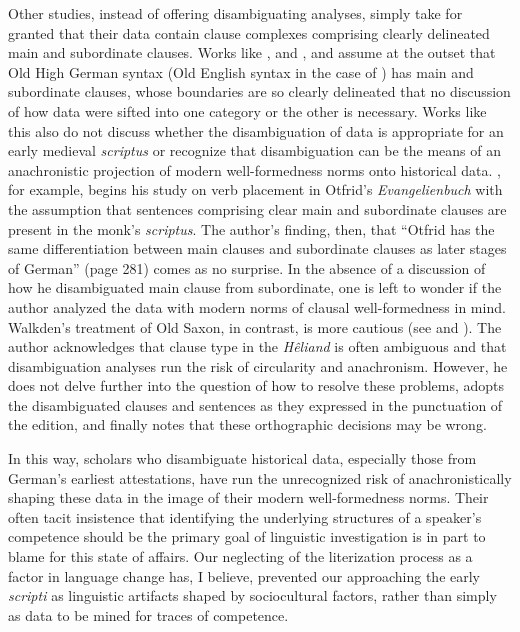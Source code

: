 Other studies, instead of offering disambiguating analyses, simply take for granted that their data contain clause complexes comprising clearly delineated main and subordinate clauses. Works like \citet{Robinson1997}, and \citet{Axel2007}, and \citet{FischerEtAl2000} assume at the outset that Old High German syntax (Old English syntax in the case of \citealt{FischerEtAl2000}) has main and subordinate clauses, whose boundaries are so clearly delineated that no discussion of how data were sifted into one category or the other is necessary. Works like this also do not discuss whether the disambiguation of data is appropriate for an early medieval \textit{scriptus} or recognize that disambiguation can be the means of an anachronistic projection of modern well-formedness norms onto historical data. \citet{Lötscher2009}, for example, begins his study on verb placement in Otfrid’s \textit{Evangelienbuch} with the assumption that sentences comprising clear main and subordinate clauses are present in the monk’s \textit{scriptus}. The author’s finding, then, that “Otfrid has the same differentiation between main clauses and subordinate clauses as later stages of German” (page 281) comes as no surprise. In the absence of a discussion of how he disambiguated main clause from subordinate, one is left to wonder if the author analyzed the data with modern norms of clausal well-formedness in mind. Walkden’s treatment of Old Saxon, in contrast, is more cautious (see \citealt[15--16]{Walkden2014} and \citealt[565]{Walkden2016}). The author acknowledges that clause type in the \textit{Hêliand} is often ambiguous and that disambiguation analyses run the risk of circularity and anachronism. However, he does not delve further into the question of how to resolve these problems, adopts the disambiguated clauses and sentences as they expressed in the punctuation of the \citet{Taeger1985} edition, and finally notes that these orthographic decisions may be wrong.

\begin{sloppypar}
In this way, scholars who disambiguate historical data, especially those from German’s earliest attestations, have run the unrecognized risk of anachronistically shaping these data in the image of their modern well-formedness norms. Their often tacit insistence that identifying the underlying structures of a speaker’s competence should be the primary goal of linguistic investigation is in part to blame for this state of affairs. Our neglecting of the literization process as a factor in language change has, I believe, prevented our approaching the early \textit{scripti} as linguistic artifacts shaped by sociocultural factors, rather than simply as data to be mined for traces of competence.
\end{sloppypar}

